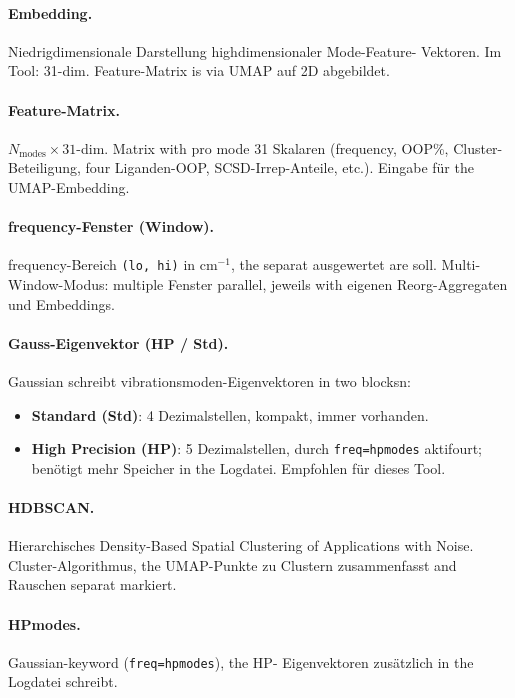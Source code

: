 \documentclass[11pt,a4paper,twoside]{article}
\theoremstyle{remark}
\begin{document}
\paragraph{Embedding.}
Niedrigdimensionale Darstellung highdimensionaler Mode-Feature-
Vektoren. Im Tool: 31-dim. Feature-Matrix is via UMAP auf 2D
abgebildet.

\paragraph{Feature-Matrix.}
$N_\text{modes} \times 31$-dim. Matrix with pro mode 31 Skalaren
(frequency, OOP\%, Cluster-Beteiligung, four Liganden-OOP,
SCSD-Irrep-Anteile, etc.). Eingabe f\"ur the UMAP-Embedding.

\paragraph{frequency-Fenster (Window).}
frequency-Bereich \texttt{(lo, hi)} in cm$^{-1}$, the separat
ausgewertet are soll. Multi-Window-Modus: multiple Fenster
parallel, jeweils with eigenen Reorg-Aggregaten und
Embeddings.

\paragraph{Gauss-Eigenvektor (HP / Std).}
Gaussian schreibt vibrationsmoden-Eigenvektoren in two blocksn:
\begin{itemize}\setlength{\itemsep}{0pt}
  \item \textbf{Standard (Std)}: 4 Dezimalstellen, kompakt, immer
        vorhanden.
  \item \textbf{High Precision (HP)}: 5 Dezimalstellen, durch
        \texttt{freq=hpmodes} aktifourt; ben\"otigt mehr Speicher
        in the Logdatei. Empfohlen f\"ur dieses Tool.
\end{itemize}

\paragraph{HDBSCAN.}
Hierarchisches Density-Based Spatial Clustering of Applications
with Noise. Cluster-Algorithmus, the UMAP-Punkte zu Clustern
zusammenfasst and Rauschen separat markiert.

\paragraph{HPmodes.}
Gaussian-keyword (\texttt{freq=hpmodes}), the HP-
Eigenvektoren zus\"atzlich in the Logdatei schreibt.
\end{document}
